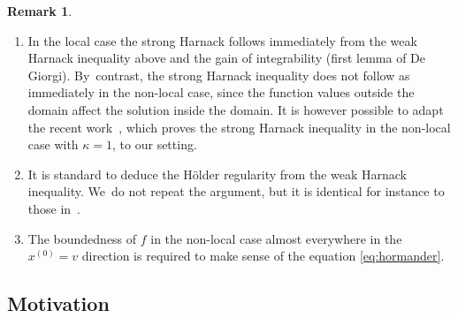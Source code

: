 \documentclass[10pt]{amsart}
\newcommand{\skpt}{\par\smallskip\noindent}
\theoremstyle{definition}
\newtheorem{remark}[theorem]{Remark}
\begin{document}
\pagebreak[2]
\skpt
\begin{remark}
\begin{enumerate}
\item In the local case the strong Harnack follows immediately
from the weak Harnack inequality above and the gain of
integrability (first lemma of De Giorgi). By~contrast, the
strong Harnack inequality does not follow as immediately in
the non-local case, since the function values outside the
domain affect the solution inside the domain. It is however
possible to adapt the recent work~\cite{APP, Loher-2023, Loher-2024}, which
proves the strong Harnack inequality in the non-local case
with $\kappa = 1$, to our setting.
\item It is standard to deduce the Hölder regularity from the
weak Harnack inequality. We~do not repeat the argument, but it
is identical for instance to those
in~\cite{guerand-mouhot,loher-2022-preprint-quantitative-de-giorgi}.
\item The boundedness of $f$ in the non-local case almost everywhere in the $x^{(0)}=v$ direction is required to make sense of the equation \eqref{eq:hormander}.
\end{enumerate}
\end{remark}

\subsection{Motivation}
\label{sub-motivation}
\end{document}
